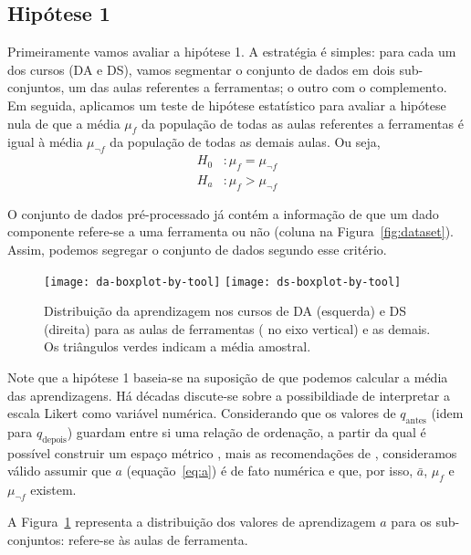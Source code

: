 \subsection{Hipótese 1}
\label{sec:resultados-hipotese-1}

Primeiramente vamos avaliar a hipótese 1.
A estratégia é simples: para cada um dos cursos (DA e DS), vamos segmentar o conjunto de dados em dois sub-conjuntos, um das aulas referentes a ferramentas; o outro com o complemento.
Em seguida, aplicamos um teste de hipótese estatístico para avaliar a hipótese nula de que a média $\mu_f$ da população de todas as aulas referentes a ferramentas é igual à média $\mu_{\neg f}$ da população de todas as demais aulas.
Ou seja,
\begin{align*}
	H_0&: \mu_f = \mu_{\neg f} \\
	H_a&: \mu_f > \mu_{\neg f}
\end{align*}

O conjunto de dados pré-processado já contém a informação de que um dado componente refere-se a uma ferramenta ou não (coluna  na Figura~\ref{fig:dataset}).
Assim, podemos segregar o conjunto de dados segundo esse critério.

\begin{figure}[b]
	\centering
	\texttt{[image: da-boxplot-by-tool]}\hfill
	\texttt{[image: ds-boxplot-by-tool]}
	\caption{Distribuição da aprendizagem nos cursos de DA (esquerda) e DS (direita) para as aulas de ferramentas ( no eixo vertical) e as demais. Os triângulos verdes indicam a média amostral.}
	\label{fig:dist-hipotese-1}
\end{figure}

Note que a hipótese 1 baseia-se na suposição de que podemos calcular a média das aprendizagens.
Há décadas discute-se sobre a possibildiade de interpretar a escala Likert como variável numérica.
Considerando que os valores de $q_\text{antes}$ (idem para $q_\text{depois}$) guardam entre si uma relação de ordenação, a partir da qual é possível construir um espaço métrico \cite[cap.~27]{Barata2020}, mais as recomendações de \cite{Harpe2015}, consideramos válido assumir que $a$ (equação~\ref{eq:a}) é de fato numérica e que, por isso, $\bar a$, $\mu_f$ e $\mu_{\neg f}$ existem.

A Figura~\ref{fig:dist-hipotese-1} representa a distribuição dos valores de aprendizagem $a$ para os sub-conjuntos:  refere-se às aulas de ferramenta.

